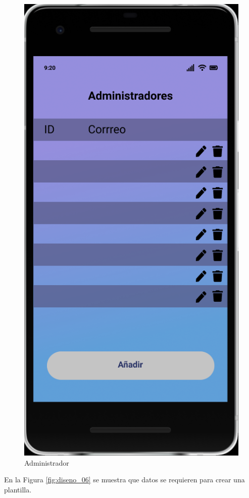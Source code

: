\documentclass{article}
\begin{document}
\begin{figure}[H]
    \centering
    \includegraphics[scale=0.8]{imgs/Figma/Admins}
    \caption{Administrador}
    \label{fig:diseno_05}
\end{figure}

En la Figura \ref{fig:diseno_06} se muestra que datos se requieren para crear 
una plantilla.
\end{document}
